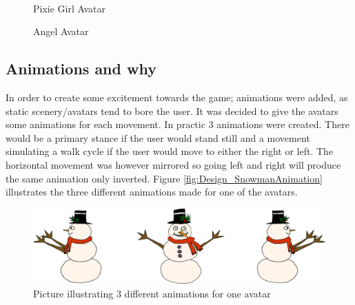 \begin{figure}[htbp]
\begin{minipage}[b]{0.45\textwidth}
\end{minipage} \\ %
\begin{minipage}[t]{0.45\textwidth}
\caption{Pixie Girl Avatar} %
\label{fig:PixieGirl}
\end{minipage} \hfill
\begin{minipage}[t]{0.45\textwidth}
\caption{Angel Avatar} %
\label{fig:Angel}
\end{minipage}
\end{figure}

\subsection{Animations and why}
In order to create some excitement towards the game; animations were added, as static scenery/avatars tend to bore the user. It was decided to give the avatars some animations for each movement. In practic 3 animations were created. There would be a primary stance if the user would stand still and a movement simulating a walk cycle if the user would move to either the right or left. The horizontal movement was however mirrored so going left and right will produce the same animation only inverted.
Figure \eqref{fig:Design_SnowmanAnimation} illustrates the three different animations made for one of the avatars.
\begin{figure}[htbp]
\centering
\includegraphics[width=1.00\textwidth]{Pictures/Design/SnowManShowOff.png}
\caption{Picture illustrating 3 different animations for one avatar}
\label{fig:Design_SnowmanAnimation}
\end{figure} 
